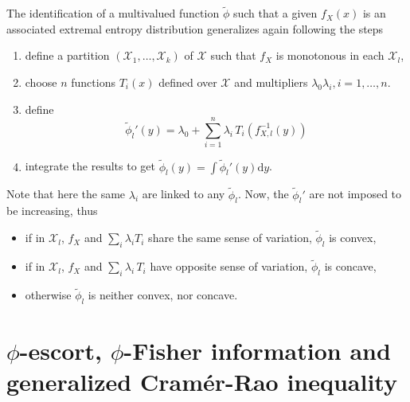 \documentclass[english]{elsarticle}
\theoremstyle{definition}
\theoremstyle{plain}
\theoremstyle{plain}
\def\d{\mathrm{d}}
\def\X{\mathcal{X}}
\def\un{\mathbbm{1}}
\newcommand{\Esp}[1]{\mathbb{E}\left[ #1 \right]}
\begin{document}
The  identification of  a multivalued  function $\widetilde{\phi}$  such  that a
given $f_X(x)$ is an  associated extremal entropy distribution generalizes again
following the steps
\begin{enumerate}
\item  define  a partition  $(\X_1,\ldots,\X_k)$  of  $\X$  such that  $f_X$  is
  monotonous in each $\X_l$,
\item choose $n$ functions $T_i(x)$ defined over $\X$ and multipliers $\lambda_0
  \lambda_i, i=1,\ldots,n$.
\item define
\begin{equation}\label{eq:derivative-phil-notconcave}
\widetilde{\phi}_l'(y) = \lambda_0 + \sum_{i=1}^n \lambda_i \,
T_i\!\left(f_{X,l}^{-1}(y)\right)
\end{equation}
\item integrate the results  to get ${\displaystyle \widetilde{\phi}_l(y) = \int
    \widetilde{\phi}_l'(y)\d y}$.
\end{enumerate}
Note  that here  the same  $\lambda_i$ are  linked to  any $\widetilde{\phi}_l$.
Now, the $\widetilde{\phi}_l'$ are not imposed to be increasing, thus
\begin{itemize}
\item if  in $\X_l$, $f_X$  and $\sum_i \lambda_i  T_i$ share the same  sense of
  variation,    $\widetilde{\phi}_l$    is    convex,
%
\item if in $\X_l$, $f_X$ and $\sum_i \lambda_i \, T_i$ have opposite
sense of variation, $\widetilde{\phi}_l$ is concave,
\item otherwise $\widetilde{\phi}_l$ is neither convex, nor concave. 
\end{itemize}



\section{$\phi$-escort, $\phi$-Fisher information and generalized Cramér-Rao
inequality}
\end{document}
